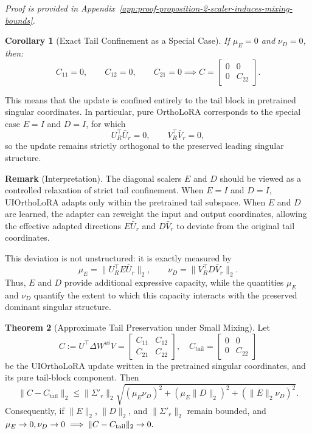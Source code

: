 \textit{Proof is provided in Appendix~\ref{app:proof-proposition-2-scaler-induces-mixing-bounds}.}

\noindent \textbf{Corollary 1} (Exact Tail Confinement as a Special Case).
\textit{
If $\mu_E = 0$ and $\nu_D = 0$, then:
\[
C_{11}=0,\qquad C_{12}=0,\qquad C_{21}=0 
\implies
C
=
\begin{bmatrix}
0 & 0 \\
0 & C_{22}
\end{bmatrix}.
\]
}

This means that the update is confined entirely to the tail block in pretrained
singular coordinates. In particular, pure OrthoLoRA corresponds to the special
case $E=I$ and $D=I$, for which
\[
U_R^\top \bar{U}_r = 0,
\qquad
V_R^\top \bar{V}_r = 0,
\]
so the update remains strictly orthogonal to the preserved leading singular
structure.

\noindent \textbf{Remark} (Interpretation).
The diagonal scalers $E$ and $D$ should be viewed as a controlled relaxation of
strict tail confinement. When $E=I$ and $D=I$, UIOrthoLoRA adapts only within the pretrained tail subspace. When $E$ and $D$ are learned, the adapter can reweight
the input and output coordinates, allowing the effective adapted directions
$E\bar{U}_r$ and $D\bar{V}_r$ to deviate from the original tail coordinates.

This deviation is not unstructured: it is exactly measured by
\[
\mu_E = \|U_R^\top E\bar{U}_r\|_2,
\qquad
\nu_D = \|V_R^\top D\bar{V}_r\|_2.
\]
Thus, $E$ and $D$ provide additional expressive capacity, while the quantities
$\mu_E$ and $\nu_D$ quantify the extent to which this capacity interacts with
the preserved dominant singular structure.


\noindent \textbf{Theorem 2} (Approximate Tail Preservation under Small Mixing).
Let
\[
C := U^\top \Delta W^{ui} V
=
\begin{bmatrix}
C_{11} & C_{12} \\
C_{21} & C_{22}
\end{bmatrix},
\quad
C_{\mathrm{tail}}
=
\begin{bmatrix}
0 & 0 \\
0 & C_{22}
\end{bmatrix}
\]
be the UIOrthoLoRA update written in the pretrained singular coordinates, and its pure tail-block component. Then
\[
\|C-C_{\mathrm{tail}}\|_2
\leq
\|\Sigma'_r\|_2
\sqrt{
(\mu_E\nu_D)^2
+
(\mu_E\|D\|_2)^2
+
(\|E\|_2\nu_D)^2
}.
\]
Consequently, if $\|E\|_2$, $\|D\|_2$, and $\|\Sigma'_r\|_2$ remain bounded, and $\mu_E \to 0,
\nu_D \to 0 \\
\implies
\|C-C_{\mathrm{tail}}\|_2 \to 0.
$

